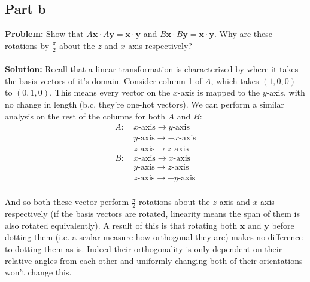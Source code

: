 \documentclass{article}
\begin{document}
\subsection*{Part b}
\textbf{Problem:} Show that $A\mathbf x\cdot A\mathbf y=\mathbf x\cdot \mathbf y$ and $B\mathbf x\cdot B\mathbf y=\mathbf x\cdot \mathbf y$. Why are these rotations by $\frac{\pi}{2}$ about the $z$ and $x$-axis respectively?
\\\\
\textbf{Solution:} Recall that a linear transformation is characterized by where it takes the basis vectors of it's domain. Consider column 1 of $A$, which takes $(1,0,0)$ to $(0,1,0)$. This means every vector on the $x$-axis is mapped to the $y$-axis, with no change in length (b.c. they're one-hot vectors). We can perform a similar analysis on the rest of the columns for both $A$ and $B$:
$$\begin{align*}
  A:\ &x\text{-axis}\to y\text{-axis}\\
  & y\text{-axis}\to -x\text{-axis}\\
  & z\text{-axis}\to z\text{-axis}\\
  B:\ &x\text{-axis}\to x\text{-axis}\\
  & y\text{-axis}\to z\text{-axis}\\
  & z\text{-axis}\to -y\text{-axis}\\
\end{align*}$$

And so both these vector perform $\frac{\pi}{2}$ rotations about the $z$-axis and $x$-axis respectively (if the basis vectors are rotated, linearity means the span of them is also rotated equivalently). A result of this is that rotating both $\mathbf x$ and $\mathbf y$ before dotting them (i.e. a scalar measure how orthogonal they are) makes no difference to dotting them as is. Indeed their orthogonality is only dependent on their relative angles from each other and uniformly changing both of their orientations won't change this.
\end{document}
